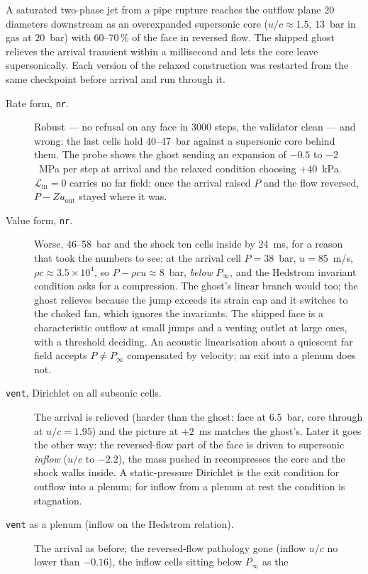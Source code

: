 \documentclass[11pt,a4paper]{article}
\newcommand{\code}[1]{\texttt{\small #1}}
\newcommand{\Lin}{\mathcal{L}_{\mathrm{in}}}
\newcommand{\uout}{u_{\mathrm{out}}}
\newcommand{\Pinf}{P_\infty}
\begin{document}
A saturated two-phase jet from a pipe rupture reaches the outflow plane
20 diameters downstream as an overexpanded supersonic core
($u/c \approx 1.5$, $13$~bar in gas at $20$~bar) with 60--70\,\% of the
face in reversed flow.  The shipped ghost relieves the arrival transient
within a millisecond and lets the core leave supersonically.  Each
version of the relaxed construction was restarted from the same
checkpoint before arrival and run through it.

\begin{description}
\item[Rate form, \code{nr}.]  Robust --- no refusal on any face in 3000
steps, the validator clean --- and wrong: the last cells hold 40--47~bar
against a supersonic core behind them.  The probe shows the ghost
sending an expansion of $-0.5$ to $-2$~MPa per step at arrival and the
relaxed condition choosing $+40$~kPa.  $\Lin = 0$ carries no far field:
once the arrival raised $P$ and the flow reversed, $P - Z\uout$ stayed
where it was.
\item[Value form, \code{nr}.]  Worse, 46--58~bar and the shock ten cells
inside by 24~ms, for a reason that took the numbers to see: at the
arrival cell $P = 38$~bar, $u = 85$~m/s, $\rho c \approx 3.5\times10^4$,
so $P - \rho c u \approx 8$~bar, \emph{below} $\Pinf$, and the Hedstrom
invariant condition asks for a compression.  The ghost's linear branch
would too; the ghost relieves because the jump exceeds its strain cap
and it switches to the choked fan, which ignores the invariants.  The
shipped face is a characteristic outflow at small jumps and a venting
outlet at large ones, with a threshold deciding.  An acoustic
linearisation about a quiescent far field accepts $P \ne \Pinf$
compensated by velocity; an exit into a plenum does not.
\item[\code{vent}, Dirichlet on all subsonic cells.]  The arrival is
relieved (harder than the ghost: face at 6.5~bar, core through at
$u/c = 1.95$) and the picture at $+2$~ms matches the ghost's.  Later it
goes the other way: the reversed-flow part of the face is driven to
supersonic \emph{inflow} ($u/c$ to $-2.2$), the mass pushed in
recompresses the core and the shock walks inside.  A static-pressure
Dirichlet is the exit condition for outflow into a plenum; for inflow
from a plenum at rest the condition is stagnation.
\item[\code{vent} as a plenum (inflow on the Hedstrom relation).]  The
arrival as before; the reversed-flow pathology gone (inflow $u/c$ no
lower than $-0.16$), the inflow cells sitting below $\Pinf$ as the

\end{description}
\end{document}
